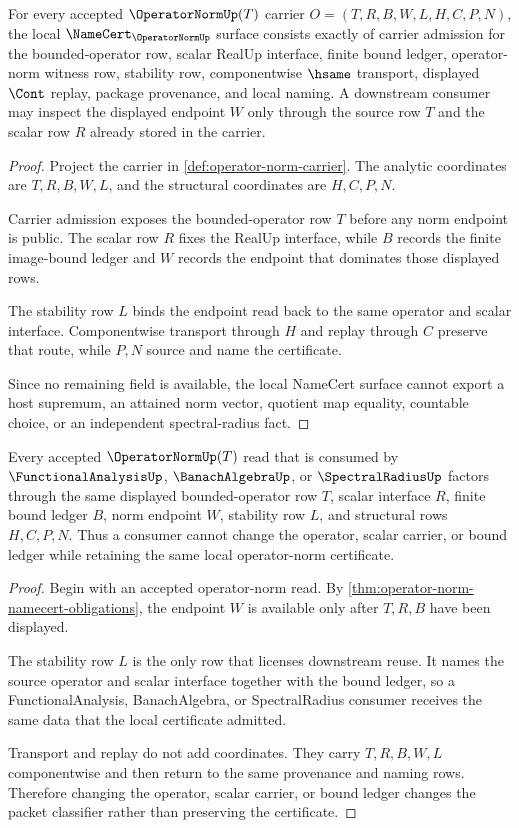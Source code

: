 \begin{theorem}
\label{thm:operator-norm-namecert-obligations}
For every accepted $\OperatorNormUp(T)$ carrier $O=(T,R,B,W,L,H,C,P,N)$, the local $\NameCert_{\OperatorNormUp}$ surface consists exactly of carrier admission for the bounded-operator row, scalar RealUp interface, finite bound ledger, operator-norm witness row, stability row, componentwise $\hsame$ transport, displayed $\Cont$ replay, package provenance, and local naming. A downstream consumer may inspect the displayed endpoint $W$ only through the source row $T$ and the scalar row $R$ already stored in the carrier.
\end{theorem}
\begin{proof}
Project the carrier in \autoref{def:operator-norm-carrier}. The analytic coordinates are $T,R,B,W,L$, and the structural coordinates are $H,C,P,N$.

Carrier admission exposes the bounded-operator row $T$ before any norm endpoint is public. The scalar row $R$ fixes the RealUp interface, while $B$ records the finite image-bound ledger and $W$ records the endpoint that dominates those displayed rows.

The stability row $L$ binds the endpoint read back to the same operator and scalar interface. Componentwise transport through $H$ and replay through $C$ preserve that route, while $P,N$ source and name the certificate.

Since no remaining field is available, the local NameCert surface cannot export a host supremum, an attained norm vector, quotient map equality, countable choice, or an independent spectral-radius fact.
\end{proof}

\begin{theorem}
\label{thm:operator-norm-stability-obligation}
Every accepted $\OperatorNormUp(T)$ read that is consumed by $\FunctionalAnalysisUp$, $\BanachAlgebraUp$, or $\SpectralRadiusUp$ factors through the same displayed bounded-operator row $T$, scalar interface $R$, finite bound ledger $B$, norm endpoint $W$, stability row $L$, and structural rows $H,C,P,N$. Thus a consumer cannot change the operator, scalar carrier, or bound ledger while retaining the same local operator-norm certificate.
\end{theorem}
\begin{proof}
Begin with an accepted operator-norm read. By \autoref{thm:operator-norm-namecert-obligations}, the endpoint $W$ is available only after $T,R,B$ have been displayed.

The stability row $L$ is the only row that licenses downstream reuse. It names the source operator and scalar interface together with the bound ledger, so a FunctionalAnalysis, BanachAlgebra, or SpectralRadius consumer receives the same data that the local certificate admitted.

Transport and replay do not add coordinates. They carry $T,R,B,W,L$ componentwise and then return to the same provenance and naming rows. Therefore changing the operator, scalar carrier, or bound ledger changes the packet classifier rather than preserving the certificate.
\end{proof}

